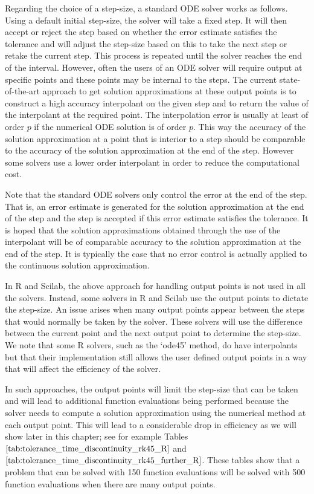 Regarding the choice of a step-size, a standard ODE solver works as follows. Using a default initial step-size, the solver will take a fixed step. It will then accept or reject the step based on whether the error estimate satisfies the tolerance and will adjust the step-size based on this to take the next step or retake the current step. This process is repeated until the solver reaches the end of the interval. However, often the users of an ODE solver will require output at specific points and these points may be internal to the steps. The current state-of-the-art approach to get solution approximations at these output points is to construct a high accuracy interpolant on the given step and to return the value of the interpolant at the required point. The interpolation error is usually at least of order $p$ if the numerical ODE solution is of order $p$. This way the accuracy of the solution approximation at a point that is interior to a step should be comparable to the accuracy of the solution approximation at the end of the step. However some solvers use a lower order interpolant in order to reduce the computational cost.

Note that the standard ODE solvers only control the error at the end of the step. That is, an error estimate is generated for the solution approximation at the end of the step and the step is accepted if this error estimate satisfies the tolerance. It is hoped that the solution approximations obtained through the use of the interpolant will be of comparable accuracy to the solution approximation at the end of the step. It is typically the case that no error control is actually applied to the continuous solution approximation.

In R and Scilab, the above approach for handling output points is not used in all the solvers. Instead, some solvers in R and Scilab use the output points to dictate the step-size. An issue arises when many output points appear between the steps that would normally be taken by the solver. These solvers will use the difference between the current point and the next output point to determine the step-size. We note that some R solvers, such as the `ode45' method, do have interpolants but that their implementation still allows the user defined output points in a way that will affect the efficiency of the solver. 

In such approaches, the output points will limit the step-size that can be taken and will lead to additional function evaluations being performed because the solver needs to compute a solution approximation using the numerical method at each output point. This will lead to a considerable drop in efficiency as we will show later in this chapter; see for example Tables $\ref{tab:tolerance_time_discontinuity_rk45_R}$ and $\ref{tab:tolerance_time_discontinuity_rk45_further_R}$. These tables show that a problem that can be solved with 150 function evaluations will be solved with 500 function evaluations when there are many output points. 

